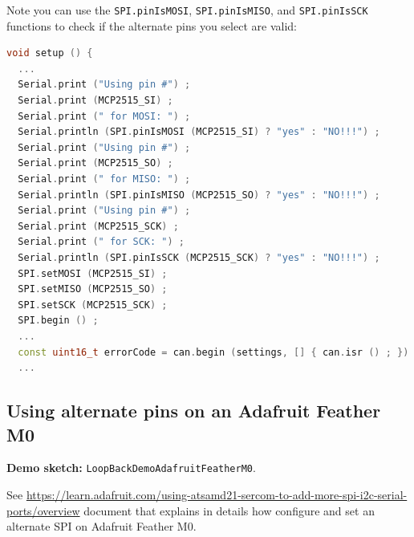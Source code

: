 \documentclass[9pt, a4paper, obeyspaces]{extarticle}
\newcommand \subsectionLabel[2]{\subsection{#1}\label{subsec:#2}}
\begin{document}
Note you can use the \texttt{SPI.pinIsMOSI}, \texttt{SPI.pinIsMISO}, and \texttt{SPI.pinIsSCK} functions to check if the alternate pins you select are valid:
{ \small\begin{lstlisting}[language=c++]
void setup () {
  ...
  Serial.print ("Using pin #") ;
  Serial.print (MCP2515_SI) ;
  Serial.print (" for MOSI: ") ;
  Serial.println (SPI.pinIsMOSI (MCP2515_SI) ? "yes" : "NO!!!") ;
  Serial.print ("Using pin #") ;
  Serial.print (MCP2515_SO) ;
  Serial.print (" for MISO: ") ;
  Serial.println (SPI.pinIsMISO (MCP2515_SO) ? "yes" : "NO!!!") ;
  Serial.print ("Using pin #") ;
  Serial.print (MCP2515_SCK) ;
  Serial.print (" for SCK: ") ;
  Serial.println (SPI.pinIsSCK (MCP2515_SCK) ? "yes" : "NO!!!") ;
  SPI.setMOSI (MCP2515_SI) ;
  SPI.setMISO (MCP2515_SO) ;
  SPI.setSCK (MCP2515_SCK) ;
  SPI.begin () ;
  ...
  const uint16_t errorCode = can.begin (settings, [] { can.isr () ; }) ;
  ...
\end{lstlisting}}




\subsectionLabel{Using alternate pins on an Adafruit Feather M0}{AdafruitFeatherM0AlternatePins}

{\bf Demo sketch: } \texttt{LoopBackDemoAdafruitFeatherM0}.

See \url{https://learn.adafruit.com/using-atsamd21-sercom-to-add-more-spi-i2c-serial-ports/overview} document that explains in details how configure and set an alternate SPI on Adafruit Feather M0.
\end{document}
